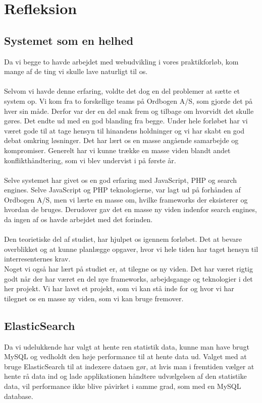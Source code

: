 \section{Refleksion}
\subsection{Systemet som en helhed}
Da vi begge to havde arbejdet med webudvikling i vores praktikforløb, kom mange af de ting vi skulle lave naturligt til os.
\\\\
Selvom vi havde denne erfaring, voldte det dog en del problemer at sætte et system op. Vi kom fra to forskellige teams på Ordbogen A/S, som gjorde det på hver sin måde. 
Derfor var der en del snak frem og tilbage om hvorvidt det skulle gøres. Det endte ud med en god blanding fra begge. 
Under hele forløbet har vi været gode til at tage hensyn til hinandens holdninger og vi har skabt en god debat omkring løsninger. Det har lært os en masse angående samarbejde og kompromiser. 
Generelt har vi kunne trække en masse viden blandt andet konflikthåndtering, som vi blev undervist i på første år. 
\\\\
Selve systemet har givet os en god erfaring med JavaScript, PHP og search engines. 
Selve JavaScript og PHP teknologierne, var lagt ud på forhånden af Ordbogen A/S,
men vi lærte en masse om, hvilke frameworks der eksisterer og hvordan de bruges.
Derudover gav det en masse ny viden indenfor search engines, da ingen af os havde arbejdet med det forinden. 
\\\\
Den teorietiske del af studiet, har hjulpet os igennem forløbet. Det at bevare overblikket og at kunne planlægge opgaver, 
hvor vi hele tiden har taget hensyn til interresenternes krav.
\\
Noget vi også har lært på studiet er, at tilegne os ny viden. Det har været rigtig godt når
der har været en del nye frameworks, arbejdsgange og teknologier i det her projekt.
Vi har lavet et projekt, som vi kan stå inde for og hvor vi har tilegnet os en masse ny viden, som vi kan bruge fremover.
\subsection{ElasticSearch}
Da vi udelukkende har valgt at hente ren statistik data, kunne man have brugt MySQL og vedholdt den høje performance til at hente data ud. 
Valget med at bruge ElasticSearch til at indexere dataen gør, at hvis man i fremtiden vælger at hente rå data ind og lade applikationen håndtere
udvælgelsen af den statistike data, vil performance ikke blive påvirket i samme grad, som med en MySQL database.

